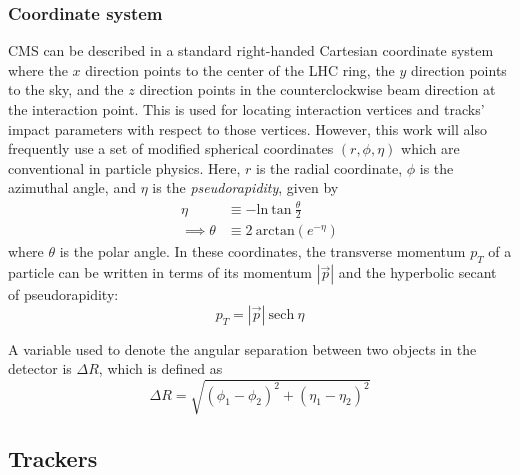 \subsubsection{Coordinate system}
CMS can be described in a standard right-handed Cartesian coordinate system where 
the $x$ direction points to the center of the LHC ring, 
the $y$ direction points to the sky,
and the $z$ direction points in the counterclockwise beam direction at the interaction point.
This is used for locating interaction vertices and tracks' impact parameters with respect to those vertices.
However, this work will also frequently use a set of modified spherical coordinates $(r,\phi,\eta)$
which are conventional in particle physics.
Here, $r$ is the radial coordinate, $\phi$ is the azimuthal angle, and $\eta$ is the \textit{pseudorapidity}, given by
\begin{equation}
\begin{split}
\eta   & \equiv {-} \mathrm{ln}\:\mathrm{tan}\:\frac{\theta}{2} \\
\implies \theta & \equiv 2\:\mathrm{arctan} \left(e^{-\eta}\right)
\label{eq:eta}
\end{split}
\end{equation}
where $\theta$ is the polar angle. 
In these coordinates, the transverse momentum $p_T$ of a particle can be written in terms of its momentum $|\vec{p}|$ and the hyperbolic secant of pseudorapidity:
\begin{equation}
p_T = |\vec{p}|~\mathrm{sech}~\eta
\end{equation}

A variable used to denote the angular separation between two objects in the detector is $\Delta R$,
which is defined as
\begin{equation}
\Delta R = \sqrt{(\phi_1-\phi_2)^2 + (\eta_1-\eta_2)^2}
\end{equation}

\subsection{Trackers}

